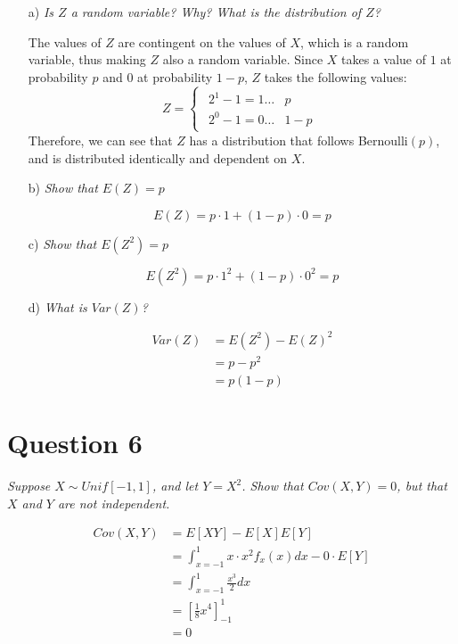 \documentclass[
]{article}
\begin{document}
\begin{enumerate}
\item[a)] \textit{Is $Z$ a random variable? Why? What is the distribution of $Z$?}  
  
The values of $Z$ are contingent on the values of $X$, which is a random variable, thus making $Z$ also a random variable. Since $X$ takes a value of $1$ at probability $p$ and $0$ at probability $1-p$, $Z$ takes the following values:
\[Z = \begin{cases}\begin{aligned}2^1 - 1 = 1 \dots &p \\
2^0 - 1 = 0 \dots &1-p \end{aligned}
\end{cases} \]
Therefore, we can see that $Z$ has a distribution that follows Bernoulli$(p)$, and is distributed identically and dependent on $X$.  

\item[b)] \textit{Show that $E(Z) = p$}  
  
\[E(Z) = p \cdot 1 + (1-p) \cdot 0 = p\]

\item[c)] \textit{Show that $E(Z^2) = p$}  
  
\[E(Z^2) = p \cdot 1^2 + (1-p) \cdot 0^2 = p\]

\item[d)] \textit{What is $Var(Z)$?}  
  
\[\begin{aligned} 
Var(Z) &= E(Z^2) - E(Z)^2 \\
&= p - p^2 \\
&= p(1-p)
\end{aligned}\]
  
\end{enumerate}

\hypertarget{question-6}{%
\section{Question 6}\label{question-6}}

\textit{Suppose $X\sim Unif[−1,1]$, and let $Y =X^2$. Show that $Cov(X,Y)=0$, but that $X$ and $Y$ are not independent.}

\[\begin{aligned} 
Cov(X,Y) &= E[XY] - E[X]E[Y] \\
&= \int_{x=-1} ^1 x \cdot x^2 f_x(x) dx  - 0 \cdot E[Y]\\
&= \int_{x=-1} ^1 \frac{x^3}{2} dx \\
&= [\frac{1}{8} x^4]^1 _{-1} \\
&= 0
\end{aligned}\]
\end{document}
